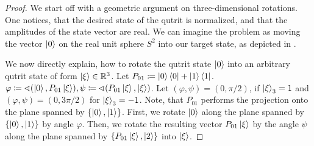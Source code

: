\begin{proof}
    We start off with a geometric argument on three-dimensional rotations. One notices, that the desired state of the qutrit is normalized, and that the amplitudes of the state vector are real. We can imagine the problem as moving the vector \(\ket{0}\) on the real unit sphere \(S^2\) into our target state, as depicted in .
    
    We now directly explain, how to rotate the qutrit state \(\ket{0}\) into an arbitrary qutrit state of form \(\ket{\xi} \in \mathbb{R}^3\). Let \(P_{01} \coloneqq \ket{0}\bra{0} + \ket{1}\bra{1}\). \(\varphi \coloneqq \sphericalangle(\ket{0}, P_{01}\ket{\xi}), \psi \coloneqq \sphericalangle(P_{01}\ket{\xi}, \ket{\xi})\). Let \((\varphi, \psi) = (0, \pi/2)\), if \(\ket{\xi}_3 = 1\) and \((\varphi, \psi) = (0, 3\pi/2)\) for \(\ket{\xi}_3 = -1\). Note, that \(P_{01}\) performs the projection onto the plane spanned by \(\{\ket{0}, \ket{1}\}\). First, we rotate \(\ket{0}\) along the plane spanned by \(\{\ket{0}, \ket{1}\}\) by angle \(\varphi\). Then, we rotate the resulting vector \(P_{01}\ket{\xi}\) by the angle \(\psi\) along the plane spanned by \(\{P_{01}\ket{\xi}, \ket{2}\}\) into \(\ket{\xi}\).
    

\end{proof}
